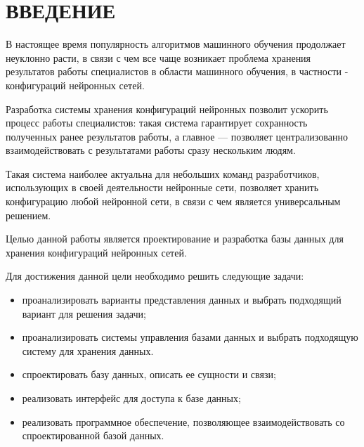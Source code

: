 \chapter*{ВВЕДЕНИЕ}

В настоящее время популярность алгоритмов машинного обучения продолжает неуклонно расти, в связи с чем все чаще возникает проблема хранения результатов работы специалистов в области машинного обучения, в частности - конфигураций нейронных сетей.~\cite{popularity}

Разработка системы хранения конфигураций нейронных позволит ускорить процесс работы специалистов: такая система гарантирует сохранность полученных ранее результатов работы, а главное --- позволяет централизованно взаимодействовать с результатами работы сразу нескольким людям.

Такая система наиболее актуальна для небольших команд разработчиков, использующих в своей деятельности нейронные сети, позволяет хранить конфигурацию любой нейронной сети, в связи с чем является универсальным решением.

Целью данной работы является проектирование и разработка базы данных для хранения конфигураций нейронных сетей.
    
Для достижения данной цели необходимо решить следующие задачи:

\begin{itemize}
    \item проанализировать варианты представления данных и выбрать подходящий вариант для решения задачи;
    \item проанализировать системы управления базами данных и выбрать подходящую систему для хранения данных.
    \item спроектировать базу данных, описать ее сущности и связи;
    \item реализовать интерфейс для доступа к базе данных;
    \item реализовать программное обеспечение, позволяющее взаимодействовать со спроектированной базой данных.
\end{itemize}